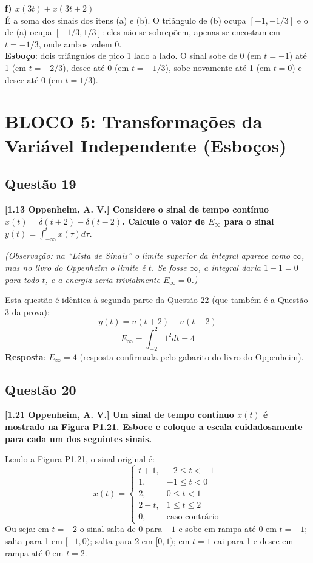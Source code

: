 \textbf{f) \(x(3t) + x(3t + 2)\)}\\
É a soma dos sinais dos itens (a) e (b). O triângulo de (b) ocupa \([-1, -1/3]\) e o de (a) ocupa \([-1/3, 1/3]\): eles não se sobrepõem, apenas se encostam em \(t = -1/3\), onde ambos valem 0.\\
\textbf{Esboço}: dois triângulos de pico 1 lado a lado. O sinal sobe de 0 (em \(t = -1\)) até 1 (em \(t = -2/3\)), desce até 0 (em \(t = -1/3\)), sobe novamente até 1 (em \(t = 0\)) e desce até 0 (em \(t = 1/3\)).

\section{BLOCO 5: Transformações da Variável Independente (Esboços)}\label{bloco-5-transformauxe7uxf5es-da-variuxe1vel-independente-esbouxe7os}

\subsection{Questão 19}\label{questuxe3o-19}

\textbf{{[}1.13 Oppenheim, A. V.{]} Considere o sinal de tempo contínuo \(x(t) = \delta(t + 2) - \delta(t - 2)\). Calcule o valor de \(E_\infty\) para o sinal \(y(t) = \int_{-\infty}^{t} x(\tau) d\tau\).}

\emph{(Observação: na ``Lista de Sinais'' o limite superior da integral aparece como \(\infty\), mas no livro do Oppenheim o limite é \(t\). Se fosse \(\infty\), a integral daria \(1 - 1 = 0\) para todo \(t\), e a energia seria trivialmente \(E_\infty = 0\).)}

Esta questão é idêntica à segunda parte da Questão 22 (que também é a Questão 3 da prova):
\[y(t) = u(t + 2) - u(t - 2)\]
\[E_\infty = \int_{-2}^{2} 1^2 dt = 4\]
\textbf{Resposta}: \(E_\infty = 4\) (resposta confirmada pelo gabarito do livro do Oppenheim).

\subsection{Questão 20}\label{questuxe3o-20}

\textbf{{[}1.21 Oppenheim, A. V.{]} Um sinal de tempo contínuo \(x(t)\) é mostrado na Figura P1.21. Esboce e coloque a escala cuidadosamente para cada um dos seguintes sinais.}

Lendo a Figura P1.21, o sinal original é:
\[x(t) = \begin{cases} t + 1, & -2 \le t < -1 \\ 1, & -1 \le t < 0 \\ 2, & 0 \le t < 1 \\ 2 - t, & 1 \le t \le 2 \\ 0, & \text{caso contrário} \end{cases}\]
Ou seja: em \(t = -2\) o sinal salta de 0 para \(-1\) e sobe em rampa até 0 em \(t = -1\); salta para 1 em \([-1, 0)\); salta para 2 em \([0, 1)\); em \(t = 1\) cai para 1 e desce em rampa até 0 em \(t = 2\).

